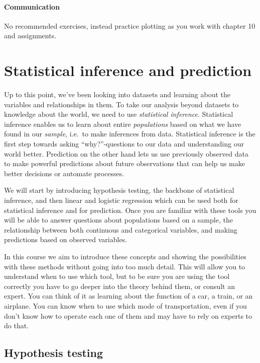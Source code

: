\documentclass[
  letterpaper,
  DIV=11,
  numbers=noendperiod]{scrreprt}
\begin{document}
\subsection*{Communication}\label{communication}

No recommended exercises, instead practice plotting as you work with
chapter 10 and assignments.

\part{Statistical inference and prediction}

Up to this point, we've been looking into datasets and learning about
the variables and relationships in them. To take our analysis beyond
datasets to knowledge about the world, we need to use \emph{statistical
inference}. Statistical inference enables us to learn about entire
\emph{populations} based on what we have found in our \emph{sample},
i.e.~to make inferences from data. Statistical inference is the first
step towards asking ``why?''-questions to our data and understanding our
world better. Prediction on the other hand lets us use previously
observed data to make powerful predictions about future observations
that can help us make better decisions or automate processes.

We will start by introducing hypothesis testing, the backbone of
statistical inference, and then linear and logistic regression which can
be used both for statistical inference and for prediction. Once you are
familiar with these tools you will be able to answer questions about
populations based on a sample, the relationship between both continuous
and categorical variables, and making predictions based on observed
variables.

{In this course we aim to introduce these concepts and showing the
possibilities with these methods without going into too much detail.
This will allow you to understand when to use which tool, but to be sure
you are using the tool correctly you have to go deeper into the theory
behind them, or consult an expert. You can think of it as learning about
the function of a car, a train, or an airplane. You can know when to use
which mode of transportation, even if you don't know how to operate each
one of them and may have to rely on experts to do that.}

\chapter{Hypothesis testing}\label{sec-inference}
\end{document}
